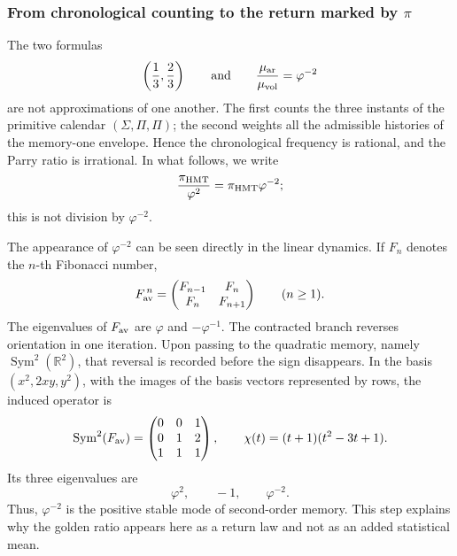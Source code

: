 \subsubsection{From chronological counting to the return marked by \texorpdfstring{\(\pi\)}{π}}
\label{p12-83-c16-s2:sec:retorno-marcado-pi-phi2}

The two formulas
\[
 \left(\frac13,\frac23\right)
 \qquad\text{and}\qquad
 \frac{\mu_{\rm ar}}{\mu_{\rm vol}}=\varphi^{-2}
\]
are not approximations of one another. The first counts the three instants of the
primitive calendar \((\Sigma,\Pi,\Pi)\); the second weights all the
admissible histories of the memory-one envelope. Hence the chronological
frequency is rational, and the Parry ratio is irrational. In what follows,
we write
\[
 \frac{\pi_{\rm HMT}}{\varphi^2}
 =\pi_{\rm HMT}\varphi^{-2};
\]
this is not division by \(\varphi^{-2}\).

The appearance of \(\varphi^{-2}\) can be seen directly in the linear
dynamics. If \(F_n\) denotes the \(n\)-th Fibonacci number,
\[
 F_{\rm av}^{\,n}
 =
 \begin{pmatrix}
  F_{n-1}&F_n\\
  F_n&F_{n+1}
 \end{pmatrix}
 \qquad(n\geq1).
\]
The eigenvalues of \(F_{\rm av}\) are \(\varphi\) and \(-\varphi^{-1}\). The contracted branch reverses orientation in one iteration. Upon passing to the quadratic memory, namely \(\operatorname{Sym}^2(\mathbb R^2)\), that reversal is recorded before the sign disappears. In the basis \((x^2,2xy,y^2)\), with the images of the basis vectors represented by rows, the induced operator is
\[
 \operatorname{Sym}^2(F_{\rm av})=
 \begin{pmatrix}
  0&0&1\\
  0&1&2\\
  1&1&1
 \end{pmatrix},
 \qquad
 \chi(t)=(t+1)(t^2-3t+1).
\]
Its three eigenvalues are
\[
 \varphi^2,\qquad -1,\qquad \varphi^{-2}.
\]
Thus, \(\varphi^{-2}\) is the positive stable mode of second-order
memory. This step explains why the golden ratio appears here as a return
law and not as an added statistical mean.

